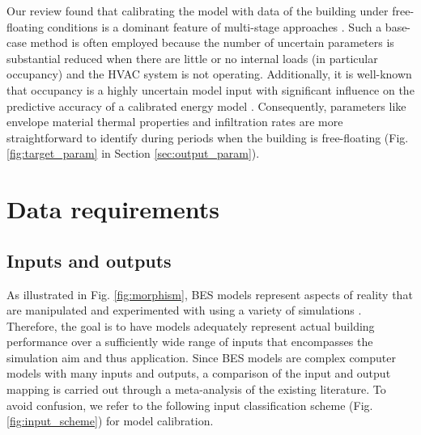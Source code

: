 \documentclass[review]{elsarticle}
\begin{document}
Our review found that calibrating the model with data of the building under free-floating conditions is a dominant feature of multi-stage approaches \cite{cipriano2015evaluation, aparicio-fernandez2019energy, cacabelos2017development, ferrara2020optimizing}. Such a base-case method is often employed because the number of uncertain parameters is substantial reduced when there are little or no internal loads (in particular occupancy) and the HVAC system is not operating. Additionally, it is well-known that occupancy is a highly uncertain model input \cite{yan2015occupant} with significant influence on the predictive accuracy of a calibrated energy model \cite{li2015why, kim2017building, chong2021occupancy}. Consequently, parameters like envelope material thermal properties and infiltration rates are more straightforward to identify during periods when the building is free-floating (Fig. \ref{fig:target_param} in Section \ref{sec:output_param}). 


\section{Data requirements} \label{sec:data_req}

\subsection{Inputs and outputs}

As illustrated in Fig. \ref{fig:morphism}, BES models represent aspects of reality that are manipulated and experimented with using a variety of simulations \cite{augenbroe2019role, aumann2007methodology}. Therefore, the goal is to have models adequately represent actual building performance over a sufficiently wide range of inputs that encompasses the simulation aim and thus application. Since BES models are complex computer models with many inputs and outputs, a comparison of the input and output mapping is carried out through a meta-analysis of the existing literature. To avoid confusion, we refer to the following input classification scheme (Fig. \ref{fig:input_scheme}) for model calibration. 
\end{document}
